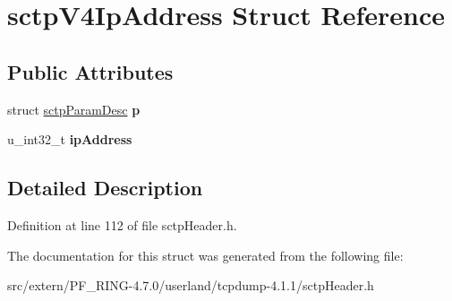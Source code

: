\hypertarget{structsctp_v4_ip_address}{
\section{sctpV4IpAddress Struct Reference}
\label{structsctp_v4_ip_address}
}
\subsection*{Public Attributes}
\begin{DoxyCompactItemize}
\item 
\hypertarget{structsctp_v4_ip_address_a6dab7c404b4345e5145b1d78ea111007}{
struct \hyperlink{structsctp_param_desc}{sctpParamDesc} {\bfseries p}}
\label{structsctp_v4_ip_address_a6dab7c404b4345e5145b1d78ea111007}

\item 
\hypertarget{structsctp_v4_ip_address_ac994f18c0c98c5c72069d24da93b48dd}{
u\_\-int32\_\-t {\bfseries ipAddress}}
\label{structsctp_v4_ip_address_ac994f18c0c98c5c72069d24da93b48dd}

\end{DoxyCompactItemize}


\subsection{Detailed Description}


Definition at line 112 of file sctpHeader.h.



The documentation for this struct was generated from the following file:\begin{DoxyCompactItemize}
\item 
src/extern/PF\_\-RING-\/4.7.0/userland/tcpdump-\/4.1.1/sctpHeader.h\end{DoxyCompactItemize}
